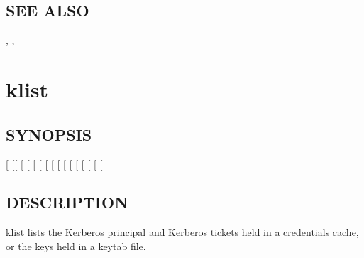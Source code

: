 \documentclass[letterpaper,10pt,english]{sphinxmanual}
\begin{document}
\subsection{SEE ALSO}
\label{\detokenize{user/user_commands/kinit:see-also}}
\sphinxAtStartPar
{\hyperref[\detokenize{user/user_commands/klist:klist-1}]{}}, {\hyperref[\detokenize{user/user_commands/kdestroy:kdestroy-1}]{}}, {\hyperref[\detokenize{user/user_config/kerberos:kerberos-7}]{}}


\section{klist}
\label{\detokenize{user/user_commands/klist:klist}}\label{\detokenize{user/user_commands/klist:klist-1}}\label{\detokenize{user/user_commands/klist::doc}}

\subsection{SYNOPSIS}
\label{\detokenize{user/user_commands/klist:synopsis}}
\sphinxAtStartPar
{}
{[}\sphinxstylestrong{\sphinxhyphen{}e}{]}
{[}{[}\sphinxstylestrong{\sphinxhyphen{}c}{]} {[}\sphinxstylestrong{\sphinxhyphen{}l}{]} {[}\sphinxstylestrong{\sphinxhyphen{}A}{]} {[}\sphinxstylestrong{\sphinxhyphen{}f}{]} {[}\sphinxstylestrong{\sphinxhyphen{}s}{]} {[} {[}\sphinxstylestrong{\sphinxhyphen{}n}{]}{]}{]}
{[}\sphinxstylestrong{\sphinxhyphen{}C}{]}
{[} {[}\sphinxstylestrong{\sphinxhyphen{}i}{]} {[}\sphinxstylestrong{\sphinxhyphen{}t}{]} {[}\sphinxstylestrong{\sphinxhyphen{}K}{]}{]}
{[}\sphinxstylestrong{\sphinxhyphen{}V}{]}
{[}\sphinxstylestrong{\sphinxhyphen{}d}{]}
{[}|\sphinxstyleemphasis{keytab\_name}{]}


\subsection{DESCRIPTION}
\label{\detokenize{user/user_commands/klist:description}}
\sphinxAtStartPar
klist lists the Kerberos principal and Kerberos tickets held in a
credentials cache, or the keys held in a keytab file.
\end{document}
